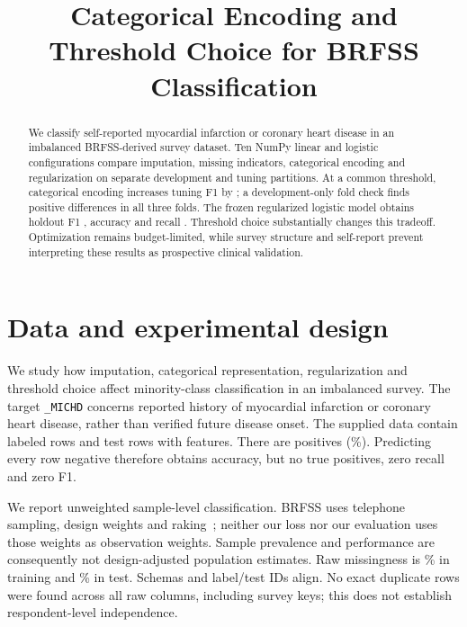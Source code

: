 \documentclass[10pt,conference,compsocconf]{IEEEtran}
\begin{document}
\title{Categorical Encoding and Threshold Choice for BRFSS Classification}

\maketitle

\begin{abstract}
We classify self-reported myocardial infarction or coronary heart disease in
an imbalanced BRFSS-derived survey dataset. Ten NumPy linear and logistic
configurations compare imputation, missing indicators, categorical encoding
and regularization on separate development and tuning partitions.
At a common threshold, categorical encoding increases tuning F1 by
\CategoryGain{}; a development-only fold check finds positive differences
in all three folds. The frozen regularized logistic model obtains holdout
F1 \HoldFone{}, accuracy \HoldAccuracy{} and recall \HoldRecall{}.
Threshold choice substantially changes this tradeoff. Optimization remains
budget-limited, while survey structure and self-report prevent interpreting
these results as prospective clinical validation.
\end{abstract}

\section{Data and experimental design}
We study how imputation, categorical representation, regularization and
threshold choice affect minority-class classification in an imbalanced survey.
The target \texttt{\_MICHD} concerns reported history of myocardial infarction
or coronary heart disease, rather than verified future disease onset.
The supplied data contain \NTrain{} labeled rows and \NTest{} test rows with
\NFeatures{} features. There are \NPositive{} positives (\Prevalence{}\%).
Predicting every row negative therefore obtains \MajorityAccuracy{} accuracy,
but no true positives, zero recall and zero F1.

We report unweighted sample-level classification. BRFSS uses telephone
sampling, design weights and raking~\cite{overview}; neither our loss nor our
evaluation uses those weights as observation weights. Sample prevalence and
performance are consequently not design-adjusted population estimates.
Raw missingness is \TrainMissing{}\% in training and \TestMissing{}\% in test.
Schemas and label/test IDs align. No exact duplicate rows were found across
all raw columns, including survey keys; this does not establish
respondent-level independence.
\end{document}
